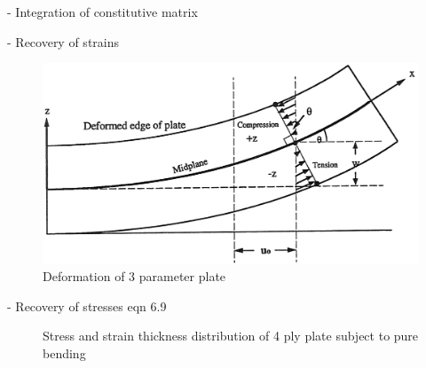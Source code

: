 - Integration of constitutive matrix


- Recovery of strains
\begin{figure}[H]
	\centering
	\def\svgwidth{\columnwidth}
	\includegraphics[width=12cm]{images/composite_nasa_strains.png}
	\caption{Deformation of 3 parameter plate \cite{nasanettles1994}}
	\label{fig:compositenasastrains}
\end{figure}

- Recovery of stresses 
\cite{agarwal2006analysis} eqn 6.9
\begin{figure}[H]
	\caption{\label{composite_stress_strain}Stress and strain thickness distribution of 4 ply plate subject to pure bending  \cite{nasanettles1994}}
\end{figure}
